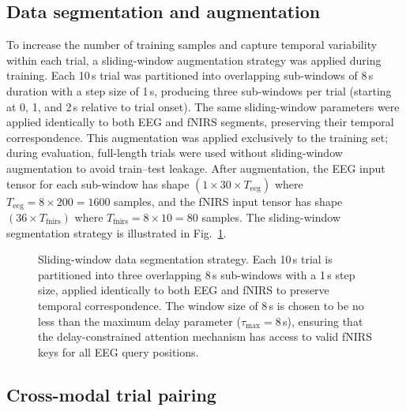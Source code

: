 \documentclass[preprint,12pt,authoryear]{elsarticle}
\begin{document}
\subsection{Data segmentation and augmentation}
\label{sec:segmentation}

To increase the number of training samples and capture temporal variability within each trial, a sliding-window augmentation strategy was applied during training. Each 10\,s trial was partitioned into overlapping sub-windows of 8\,s duration with a step size of 1\,s, producing three sub-windows per trial (starting at 0, 1, and 2\,s relative to trial onset). The same sliding-window parameters were applied identically to both EEG and fNIRS segments, preserving their temporal correspondence. This augmentation was applied exclusively to the training set; during evaluation, full-length trials were used without sliding-window augmentation to avoid train--test leakage. After augmentation, the EEG input tensor for each sub-window has shape $(1 \times 30 \times T_{\text{eeg}})$ where $T_{\text{eeg}} = 8 \times 200 = 1600$ samples, and the fNIRS input tensor has shape $(36 \times T_{\text{fnirs}})$ where $T_{\text{fnirs}} = 8 \times 10 = 80$ samples. The sliding-window segmentation strategy is illustrated in Fig.~\ref{fig:segmentation}.

\begin{figure}[t]
\centering
\caption{Sliding-window data segmentation strategy. Each 10\,s trial is partitioned into three overlapping 8\,s sub-windows with a 1\,s step size, applied identically to both EEG and fNIRS to preserve temporal correspondence. The window size of 8\,s is chosen to be no less than the maximum delay parameter ($\tau_{\max}=8$\,s), ensuring that the delay-constrained attention mechanism has access to valid fNIRS keys for all EEG query positions.}
\label{fig:segmentation}
\end{figure}

\subsection{Cross-modal trial pairing}
\label{sec:pairing}
\end{document}
